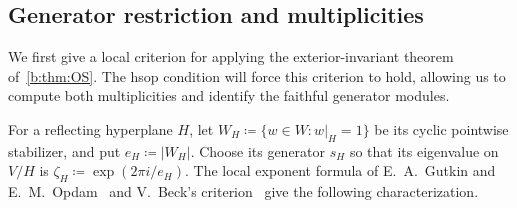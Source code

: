 \documentclass[10pt,a4paper]{amsart}
\newcommand{\defeq}{\coloneqq}
\theoremstyle{definition}
\begin{document}
\subsection{Generator restriction and multiplicities}\label{sec:reflection-restrictions}

We first give a local criterion for applying the exterior-invariant
theorem of~\cref{b:thm:OS}. The hsop condition will force this criterion to
hold, allowing us to compute both multiplicities and identify the
faithful generator modules.

For a reflecting hyperplane $H$, let
$W_H\defeq\{w\in W:w|_H=1\}$ be its cyclic pointwise stabilizer,
and put $e_H\defeq|W_H|$. Choose its generator $s_H$ so
that its eigenvalue on $V/H$ is $\zeta_H\defeq\exp(2\pi i/e_H)$.
The local exponent formula of E.~A.~Gutkin and E.~M.~Opdam~\cite[Lemma 2.1]{Opdam}
and V.~Beck's criterion~\cite[Definition 4(ii) and Remark 1(i)]{Beck}
give the following characterization.
\end{document}
